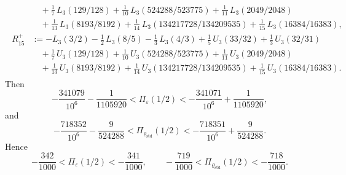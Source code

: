 \begin{lemma}
\begin{equation}
\begin{gathered}
\begin{aligned}
    &\quad+\frac17\,L_3(129/128)
    +\frac1{10}\,L_3(524288/523775)
    +\frac1{11}\,L_3(2049/2048)\\
    &\quad+\frac1{13}\,L_3(8193/8192)
    +\frac1{14}\,L_3(134217728/134209535)
    +\frac1{15}\,L_3(16384/16383),\\
    R_{15}^+
    &:=
    -L_3(3/2)-\frac12\,L_3(8/5)-\frac13\,L_3(4/3)
    +\frac15\,U_3(33/32)+\frac13\,U_3(32/31)\\
    &\quad+\frac17\,U_3(129/128)
    +\frac1{10}\,U_3(524288/523775)
    +\frac1{11}\,U_3(2049/2048)\\
    &\quad+\frac1{13}\,U_3(8193/8192)
    +\frac1{14}\,U_3(134217728/134209535)
    +\frac1{15}\,U_3(16384/16383).
  \end{aligned}
  \end{gathered}
  \end{equation}
  Then
  \begin{equation}\label{eq:s3-example-certified-intervals-sharp}
    -\frac{341079}{10^6}-\frac{1}{1105920}
    <\Pi_\varepsilon(1/2)<
    -\frac{341071}{10^6}+\frac{1}{1105920},
  \end{equation}
  and
  \begin{equation}\label{eq:s3-example-certified-intervals-sharp-rho}
    -\frac{718352}{10^6}-\frac{9}{524288}
    <\Pi_{\varrho_{\mathrm{std}}}(1/2)<
    -\frac{718351}{10^6}+\frac{9}{524288}.
  \end{equation}
  Hence
  \[
    -\frac{342}{1000}<\Pi_\varepsilon(1/2)<-\frac{341}{1000},
    \qquad
    -\frac{719}{1000}<\Pi_{\varrho_{\mathrm{std}}}(1/2)<-\frac{718}{1000}.
  \]
\end{lemma}

